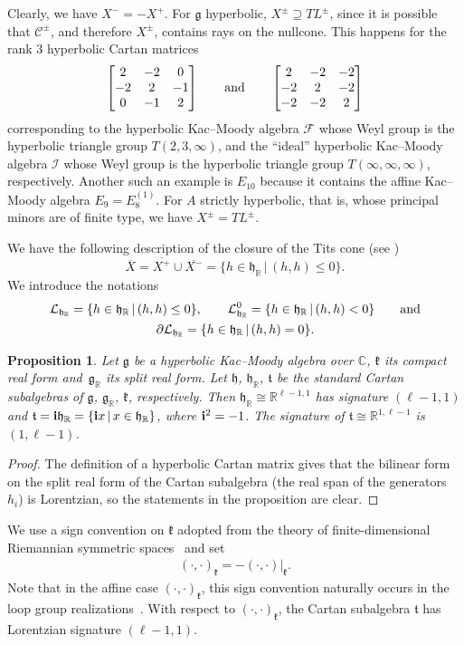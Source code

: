 \documentclass[11pt]{article}
\numberwithin{equation}{section}
\numberwithin{equation}{section}
\newtheorem{Proposition}[Theorem]{Proposition}
 { \theoremstyle{definition}
\newtheorem{Definition}[Theorem]{Definition}
\newtheorem{Remark}[Theorem]{Remark} }
\def\C{{\mathbb C}}
\def\R{\mathbb{R}}
\def\bi{{\bf i}}
\def\cC{\mathcal C}
\def\cF{\mathcal F}
\def\cI{\mathcal I}
\def\cL{\mathcal L}
\def\g{\mathfrak{g}}
\def\h{\mathfrak{h}}
\def\k{\mathfrak{k}}
\def\ft{\mathfrak{t}}
\begin{document}
Clearly, we have $X^- = - X^+$. For $\g$ hyperbolic, $X^\pm \supseteq TL^\pm$, since it is possible that $\cC^\pm$, and therefore $X^\pm$, contains rays on the nullcone. This happens for the rank $3$ hyperbolic Cartan matrices
\[\bmatrix 2&-2&0 \\ -2&2&-1 \\ 0&-1&2 \endbmatrix \qquad\hbox{and}\qquad \bmatrix 2&-2&-2 \\ -2&2&-2 \\ -2&-2&2 \endbmatrix\]
corresponding to the hyperbolic Kac--Moody algebra $\cF$ \cite{FeingoldFrenkel83} whose Weyl group is the hyperbolic triangle group
$T(2,3,\infty)$, and the ``ideal'' hyperbolic Kac--Moody algebra $\cI$ whose Weyl group is the hyperbolic triangle group
$T(\infty,\infty,\infty)$, respectively.
Another such an example is $E_{10}$ because it contains the affine Kac--Moody algebra $E_{9} = E_8^{(1)}$.
For $A$ strictly hyperbolic, that is, whose principal minors are of finite type, we have $X^\pm = TL^\pm$.

We have the following description of the closure of the Tits cone (see \cite[equation~(5.10.2)]{Kac90})
\[\overline{X} = \overline{X^+}\cup \overline{X^-} = \{h\in \h_{\R}\,|\, (h, h)\leq 0\}.\]
We introduce the notations
\begin{gather*}
\cL_{\h_{\R}}=\{h\in \h_{\R}\,|\, (h, h)\leq 0\},\qquad
\cL_{\h_{\R}}^0=\{h\in \h_{\R}\,|\, (h, h)< 0\}\qquad \hbox{and}\\
\partial\cL_{\h_{\R}}=\{h\in \h_{\R}\,|\, (h, h)= 0\}.
\end{gather*}

\begin{Proposition} Let $\g$ be a hyperbolic Kac--Moody algebra over $\C$, $\k$ its compact real form and~$\g_\R$ its split real form. Let $\h$, $\h_\R$, $\ft$ be the standard Cartan subalgebras of $\g$, $\g_\R$, $\k$, respectively. Then $\h_{\R}\cong \R^{\ell-1,1}$ has signature $(\ell-1,1)$ and
$\ft= {\bi}\h_{\R} = \{{\bi}x\,|\, x\in \h_{\R}\}$, where ${\bi}^2=-1$. The signature of $\ft \cong \R^{1,\ell-1}$ is $(1,\ell-1)$.
\end{Proposition}
\begin{proof} The definition of a hyperbolic Cartan matrix gives that the bilinear form on the split real form of the Cartan subalgebra (the real span of the generators~$h_i$) is Lorentzian, so the statements in the proposition are clear.
\end{proof}

We use a sign convention on $\k$ adopted from the theory of finite-dimensional Riemannian symmetric spaces~\cite{Helgason01} and set
\begin{gather}\label{equation:compactmetric}
(\cdot,\cdot)_{\k} = - (\cdot,\cdot)|_{\k}.
\end{gather}
Note that in the affine case $(\cdot,\cdot)_{\k}$, this sign convention naturally occurs in the loop group realizations~\cite{Freyn09, PressleySegal86}. With respect to $(\cdot,\cdot)_{\k}$, the Cartan subalgebra $\ft$ has Lorentzian signature $(\ell-1,1)$.
\end{document}
